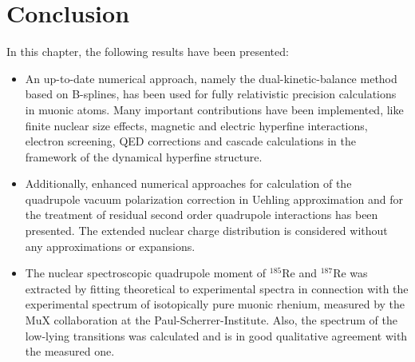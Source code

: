\section{Conclusion}
\label{sec:muon_summary}
In this chapter, the following results have been presented:\\
\begin{itemize}
\setlength{\itemsep}{0.75cm}
\item An up-to-date numerical approach, namely the dual-kinetic-balance method based on B-splines, has been used for fully relativistic precision calculations in muonic atoms. Many important contributions have been implemented, like finite nuclear size effects, magnetic and electric hyperfine interactions, electron screening, QED corrections and cascade calculations in the framework of the dynamical hyperfine structure.
\item Additionally, enhanced numerical approaches for calculation of the quadrupole vacuum polarization correction in Uehling approximation and for the treatment of residual second order quadrupole interactions has been presented. The extended nuclear charge distribution is considered without any approximations or expansions.
\item  The nuclear spectroscopic quadrupole moment of $^{185}$Re and $^{187}$Re was extracted by fitting theoretical to experimental spectra in connection with the experimental spectrum of isotopically pure muonic rhenium, measured by the MuX collaboration at the Paul-Scherrer-Institute. Also, the spectrum of the low-lying transitions was calculated and is in good qualitative agreement with the measured one. 
\end{itemize}
